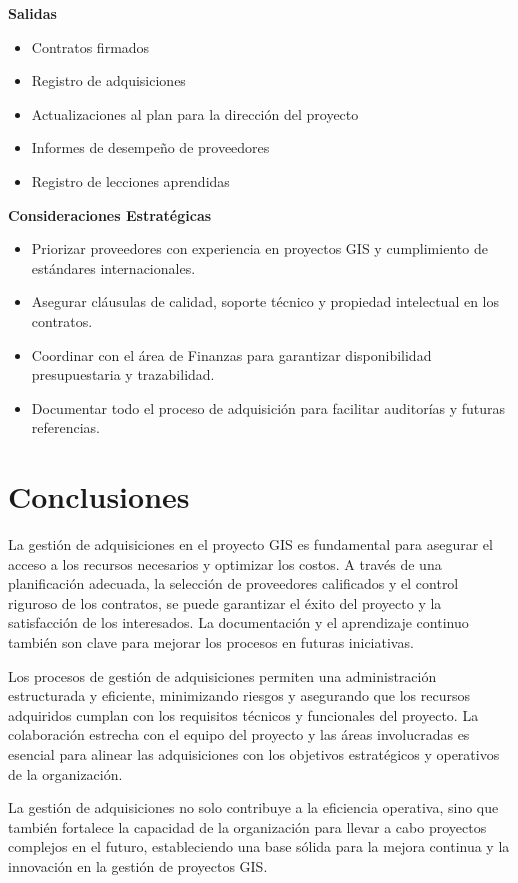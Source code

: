 \begin{multicols}{2}
\textbf{Salidas}
\begin{itemize}
    \item Contratos firmados
    \item Registro de adquisiciones
    \item Actualizaciones al plan para la dirección del proyecto
    \item Informes de desempeño de proveedores
    \item Registro de lecciones aprendidas
\end{itemize}

\textbf{Consideraciones Estratégicas}
\begin{itemize}
    \item Priorizar proveedores con experiencia en proyectos GIS y cumplimiento de estándares internacionales.
    \item Asegurar cláusulas de calidad, soporte técnico y propiedad intelectual en los contratos.
    \item Coordinar con el área de Finanzas para garantizar disponibilidad presupuestaria y trazabilidad.
    \item Documentar todo el proceso de adquisición para facilitar auditorías y futuras referencias.
\end{itemize}

\end{multicols}

\section{Conclusiones}

La gestión de adquisiciones en el proyecto GIS es fundamental para asegurar el acceso a los recursos necesarios y optimizar los costos. A través de una planificación adecuada, la selección de proveedores calificados y el control riguroso de los contratos, se puede garantizar el éxito del proyecto y la satisfacción de los interesados. La documentación y el aprendizaje continuo también son clave para mejorar los procesos en futuras iniciativas.

Los procesos de gestión de adquisiciones permiten una administración estructurada y eficiente, minimizando riesgos y asegurando que los recursos adquiridos cumplan con los requisitos técnicos y funcionales del proyecto. La colaboración estrecha con el equipo del proyecto y las áreas involucradas es esencial para alinear las adquisiciones con los objetivos estratégicos y operativos de la organización.

La gestión de adquisiciones no solo contribuye a la eficiencia operativa, sino que también fortalece la capacidad de la organización para llevar a cabo proyectos complejos en el futuro, estableciendo una base sólida para la mejora continua y la innovación en la gestión de proyectos GIS.